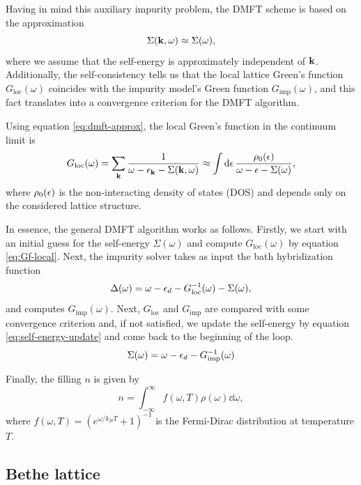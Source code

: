 \documentclass[12pt]{report}
\begin{document}
Having in mind this auxiliary impurity problem, the DMFT scheme is based on the approximation
\begin{equation} \label{eq:dmft-approx}
\Sigma({\vb{k}}, \omega) \approx \Sigma(\omega),
\end{equation}
where we assume that the self-energy is approximately independent of ${\vb{k}}$. Additionally, the self-consistency tells us that the local lattice Green's function $G_{\text{loc}}(\omega)$ coincides with the impurity model's Green function $G_{\text{imp}}(\omega)$, and this fact translates into a convergence criterion for the DMFT algorithm.

Using equation \ref{eq:dmft-approx}, the local Green's function in the continuum limit is
\begin{equation} \label{eq:Gf-local}
G_{\text{loc}}(\omega) = \sum_{{\vb{k}}} \frac{1}{\omega-\epsilon_{\vb{k}}-\Sigma({\vb{k}}, \omega)} \approx
\int \dd{\epsilon} \frac{\rho_0(\epsilon)}{\omega - \epsilon - \Sigma(\omega)},
\end{equation}
where $\rho_0(\epsilon)$ is the non-interacting density of states (DOS) and depends only on the considered lattice structure.

In essence, the general DMFT algorithm works as follows. Firstly, we start with an initial guess for the self-energy $\Sigma(\omega)$ and compute $G_{\text{loc}}(\omega)$ by equation \ref{eq:Gf-local}. Next, the impurity solver takes as input the bath hybridization function
\begin{equation} \label{eq:hybridization-func}
\Delta(\omega) = \omega - \epsilon_d - G_{\text{loc}}^{-1}(\omega) - \Sigma(\omega),
\end{equation}
and computes $G_{\text{imp}}(\omega)$. Next, $G_{\text{loc}}$ and $G_{\text{imp}}$ are compared with some convergence criterion and, if not satisfied, we update the self-energy by equation \ref{eq:self-energy-update} and come back to the beginning of the loop.
\begin{equation} \label{eq:self-energy-update}
\Sigma(\omega) = \omega - \epsilon_d - G_{\text{imp}}^{-1}(\omega)
\end{equation}

Finally, the filling $n$ is given by \cite{bruus}
\begin{equation} \label{eq:filling}
n = \int_{-\infty}^{\infty} f(\omega, T) \rho(\omega) \dd{\omega},
\end{equation}
where $f(\omega, T) = (e^{\omega/k_B T} + 1)^{-1}$ is the Fermi-Dirac distribution at temperature $T$.

\subsection{Bethe lattice} \label{sec:bethe}
\end{document}
